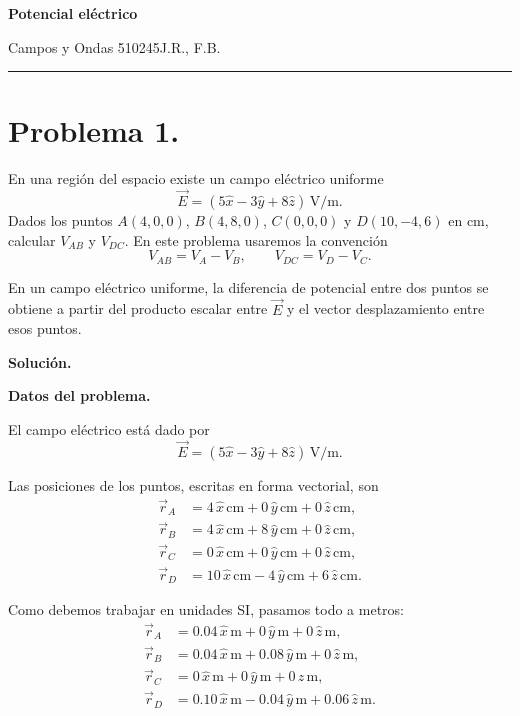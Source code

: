 \documentclass[11pt]{article}
\newcommand{\encabezado}[3]{%
{\Large\bfseries #1\par}
\vspace{2pt}
{\normalsize #2\hfill #3\par}
\vspace{6pt}\hrule\vspace{8pt}}
\newcommand{\soluciontitulo}{%
  \par\medskip
  \noindent\textbf{Solución.}\par
  \smallskip
}
\begin{document}
\encabezado{Potencial eléctrico}{Campos y Ondas 510245}{J.R., F.B.}
\shorthandoff{<>}


\section*{Problema 1.}
En una regi\'on del espacio existe un campo el\'ectrico uniforme
\begin{equation*}
    \vec E=(5\hat{x}-3\hat{y}+8\hat{z})\,\text{V/m}.
\end{equation*}
Dados los puntos $A(4,0,0)$, $B(4,8,0)$, $C(0,0,0)$ y $D(10,-4,6)$ en cm, calcular $V_{AB}$ y $V_{DC}$. En este problema usaremos la convenci\'on
\begin{equation*}
    V_{AB}=V_A-V_B,
    \qquad
    V_{DC}=V_D-V_C.
\end{equation*}

\par\medskip\noindent En un campo el\'ectrico uniforme, la diferencia de potencial entre dos puntos se obtiene a partir del producto escalar entre $\vec E$ y el vector desplazamiento entre esos puntos.\par\medskip 

\soluciontitulo

\textbf{Datos del problema.}

El campo el\'ectrico est\'a dado por
\begin{equation*}
    \vec E=(5\hat{x}-3\hat{y}+8\hat{z})\,\text{V/m}.
\end{equation*}

Las posiciones de los puntos, escritas en forma vectorial, son
\begin{align*}
    \vec r_A&=4\,\hat{x}\,\text{cm}+0\,\hat{y}\,\text{cm}+0\,\hat{z}\,\text{cm},\\
    \vec r_B&=4\,\hat{x}\,\text{cm}+8\,\hat{y}\,\text{cm}+0\,\hat{z}\,\text{cm},\\
    \vec r_C&=0\,\hat{x}\,\text{cm}+0\,\hat{y}\,\text{cm}+0\,\hat{z}\,\text{cm},\\
    \vec r_D&=10\,\hat{x}\,\text{cm}-4\,\hat{y}\,\text{cm}+6\,\hat{z}\,\text{cm}.
\end{align*}

Como debemos trabajar en unidades SI, pasamos todo a metros:
\begin{align*}
    \vec r_A&=0.04\,\hat{x}\,\text{m}+0\,\hat{y}\,\text{m}+0\,\hat{z}\,\text{m},\\
    \vec r_B&=0.04\,\hat{x}\,\text{m}+0.08\,\hat{y}\,\text{m}+0\,\hat{z}\,\text{m},\\
    \vec r_C&=0\,\hat{x}\,\text{m}+0\,\hat{y}\,\text{m}+0\,\hat{z}\,\text{m},\\
    \vec r_D&=0.10\,\hat{x}\,\text{m}-0.04\,\hat{y}\,\text{m}+0.06\,\hat{z}\,\text{m}.
\end{align*}
\end{document}
